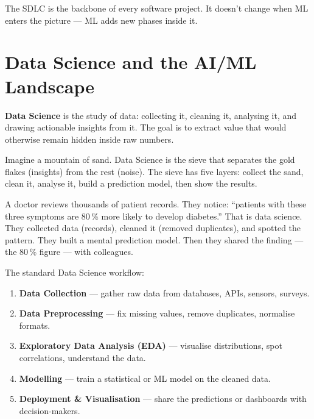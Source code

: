 \documentclass[a4paper,11pt]{article}
\newcommand{\vocab}[1]{\textbf{\color{navy}#1}}
\begin{document}
\begin{keytake}
The SDLC is the backbone of every software project. It doesn't change when ML enters the picture --- ML adds new phases inside it.
\end{keytake}

\section{Data Science and the AI/ML Landscape}

\vocab{Data Science} is the study of data: collecting it, cleaning it, analysing it, and drawing actionable insights from it. The goal is to extract value that would otherwise remain hidden inside raw numbers.

\begin{intuition}
Imagine a mountain of sand. Data Science is the sieve that separates the gold flakes (insights) from the rest (noise). The sieve has five layers: collect the sand, clean it, analyse it, build a prediction model, then show the results.
\end{intuition}

\begin{everyday}
A doctor reviews thousands of patient records. They notice: ``patients with these three symptoms are 80\,\% more likely to develop diabetes.'' That is data science. They collected data (records), cleaned it (removed duplicates), and spotted the pattern. They built a mental prediction model. Then they shared the finding --- the 80\,\% figure --- with colleagues.
\end{everyday}

The standard Data Science workflow:
\begin{enumerate}
  \item \textbf{Data Collection} — gather raw data from databases, APIs, sensors, surveys.
  \item \textbf{Data Preprocessing} — fix missing values, remove duplicates, normalise formats.
  \item \textbf{Exploratory Data Analysis (EDA)} — visualise distributions, spot correlations, understand the data.
  \item \textbf{Modelling} — train a statistical or ML model on the cleaned data.
  \item \textbf{Deployment \& Visualisation} — share the predictions or dashboards with decision-makers.
\end{enumerate}
\end{document}
